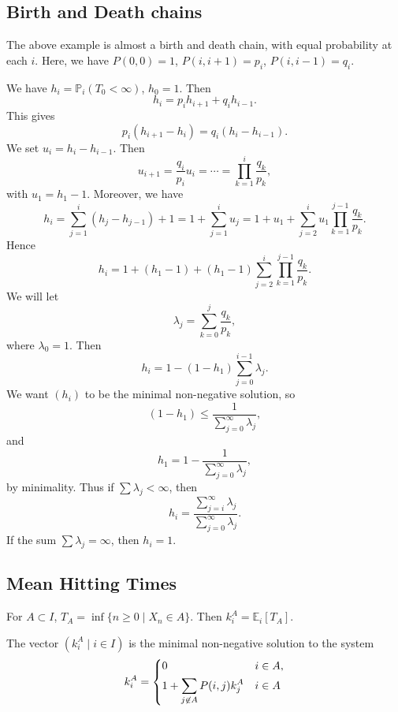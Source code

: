 \documentclass[12pt]{article}
\begin{document}
\subsection{Birth and Death chains}%
\label{sub:birth_and_death_chains}

The above example is almost a birth and death chain, with equal probability at each $i$. Here, we have $P(0, 0) = 1$, $P(i, i+1) = p_i$, $P(i, i-1) = q_i$.

We have $h_i = \mathbb{P}_i(T_0 < \infty)$, $h_0 = 1$. Then
\[
h_i = p_i h_{i+1} + q_i h_{i-1}
.\]
This gives
\[
	p_i (h_{i+1} - h_i) = q_i(h_{i} - h_{i-1})
.\]
We set $u_i = h_i - h_{i-1}$. Then
\[
u_{i+1} = \frac{q_i}{p_i} u_i = \cdots = \prod_{k = 1}^{i} \frac{q_k}{p_k}
,\]
with $u_1 = h_1 - 1$. Moreover, we have
\[
	h_i = \sum_{j = 1}^{i} (h_{j} - h_{j-1}) + 1 = 1 + \sum_{j = 1}^{i} u_j = 1 + u_1 + \sum_{j = 2}^{i} u_1 \prod_{k = 1}^{j-1} \frac{q_k}{p_k}
.\]
Hence
\[
	h_i = 1 + (h_1 - 1) + (h_1 - 1) \sum_{j = 2}^{i} \prod_{k = 1}^{j-1} \frac{q_k}{p_k}
.\]
We will let
\[
\lambda_j = \sum_{k = 0}^{j}\frac{q_k}{p_k}
,\]
where $\lambda_0 = 1$. Then
 \[
	 h_i = 1 - (1 - h_1) \sum_{j = 0}^{i-1} \lambda_j
.\]
We want $(h_i)$ to be the minimal non-negative solution, so
\[
	(1 - h_1) \leq \frac{1}{\sum_{j = 0}^{\infty} \lambda_j}
,\]
and
\[
h_1 = 1 - \frac{1}{\sum_{j = 0}^{\infty} \lambda_j}
,\]
by minimality. Thus if $\sum \lambda_j < \infty$, then
\[
h_i = \frac{\sum_{j = i}^{\infty} \lambda_j}{\sum_{j = 0}^{\infty} \lambda_j}
.\]
If the sum $\sum \lambda_j = \infty$, then $h_i = 1$.

\subsection{Mean Hitting Times}%
\label{sub:mean_hitting_times}

For $A \subset I$, $T_A = \inf\{n \geq 0 \mid X_n \in A\}$. Then $k^{A}_i = \mathbb{E}_i[T_A]$.

\begin{theorem}
	The vector $(k_i^{A} \mid i \in I)$ is the minimal non-negative solution to the system
	\[
	k_i^{A} =
	\begin{dcases}
		0 & i \in A, \\
		1 + \sum_{j \not \in A}P(i, j) k_j^{A} & i \in A
	\end{dcases}
	\]
\end{theorem}
\end{document}
